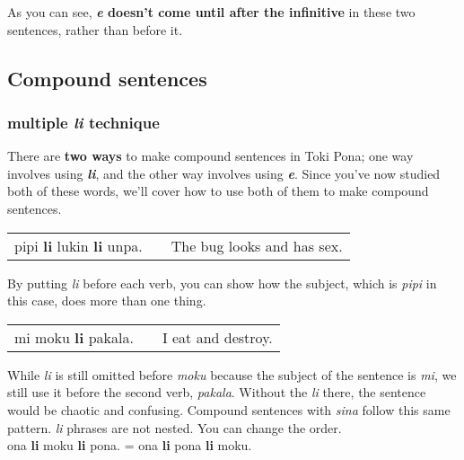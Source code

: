 As you can see, \textbf{\textit{e} doesn't come until after the infinitive} in these two sentences, rather than before it. 

\newpage
{}
\label{'multiple_li'}
\subsection*{Compound sentences}
\subsubsection*{multiple \textit{li} technique}
%
There are \textbf{two ways} to make compound sentences in Toki Pona; one way involves using \textbf{\textit{li}}, and the other way involves using \textbf{\textit{e}}. 
Since you've now studied both of these words, we'll cover how to use both of them to make compound sentences. 

\begin{supertabular}{p{5,5cm}|ll}
pipi \textbf{li} lukin \textbf{li} unpa. && The bug looks and has sex. \\
\end{supertabular} 

By putting \textit{li} before each verb, you can show how the subject, which is \textit{pipi} in this case, does more than one thing. 

\begin{supertabular}{p{5,5cm}|ll}
mi moku \textbf{li} pakala. && I eat and destroy. \\
\end{supertabular} 

While \textit{li} is still omitted before \textit{moku} because the subject of the sentence is \textit{mi}, we still use it before the second verb, \textit{pakala}. 
Without the \textit{li} there, the sentence would be chaotic and confusing. 
Compound sentences with \textit{sina} follow this same pattern. 
\textit{li} phrases are not nested. You can change the order. \\
ona \textbf{li} moku \textbf{li} pona. = ona \textbf{li} pona \textbf{li} moku. 
%
\label{'multiple_e'}
